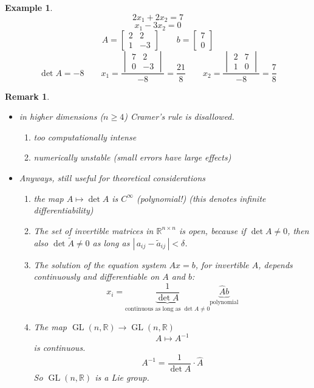 \documentclass[a4paper,landscape,twocolumn]{article}
\newcommand\abs[1]{|\,#1\,|}
\newtheorem{ex}{Example}
\newtheorem{rem}{Remark}
\begin{document}
\begin{ex}
  \label{exercise-7.42}
  \[ 2x_1 + 2x_2 = 7 \]
  \[ x_1 - 3x_2 = 0 \]
  \[ A = \begin{bmatrix} 2 & 2 \\ 1 & -3 \end{bmatrix} \qquad b = \begin{bmatrix} 7 \\ 0 \end{bmatrix} \]
  \[
    \det{A} = -8 \qquad
    x_1 = \frac{\begin{vmatrix} 7 & 2 \\ 0 & -3 \end{vmatrix}}{-8} = \frac{21}{8} \qquad
    x_2 = \frac{\begin{vmatrix} 2 & 7 \\ 1 & 0 \end{vmatrix}}{-8} = \frac78
  \]
\end{ex}
\begin{rem}
  \label{bem-7.43}
  \begin{itemize}
    \item in higher dimensions ($n \geq 4$)
      Cramer's rule is disallowed.
      \begin{enumerate}
        \item too computationally intense
        \item numerically unstable (small errors have large effects)
      \end{enumerate}
    \item Anyways, still useful for theoretical considerations
      \begin{enumerate}
        \item the map $A \mapsto \det{A}$ is $C^\infty$ (polynomial!) (this denotes infinite differentiability)
        \item The set of invertible matrices in $\mathbb R^{n\times n}$ is open,
          because if $\det{A} \neq 0$, then also $\det{\tilde{A}} \neq 0$ as long as $\abs{a_{ij} - \tilde{a}_{ij}} < \delta$.
        \item The solution of the equation system $Ax = b$, for invertible $A$, depends continuously and differentiable
          on $A$ and $b$:
          \[
            x_i
            = \underbrace{\frac{1}{\det{A}}}_{\text{continuous as long as } \det{A} \neq 0} \underbrace{\hat{A} b}_{\text{polynomial}}
          \]
        \item The map $\operatorname{GL}(n,\mathbb R) \to \operatorname{GL}(n,\mathbb R)$
          \[ A \mapsto A^{-1} \]
          is continuous.
          \[ A^{-1} = \frac{1}{\det{A}} \cdot \hat{A} \]
          So $\operatorname{GL}(n,\mathbb R)$ is a Lie group.
      \end{enumerate}
  \end{itemize}
\end{rem}
\end{document}
